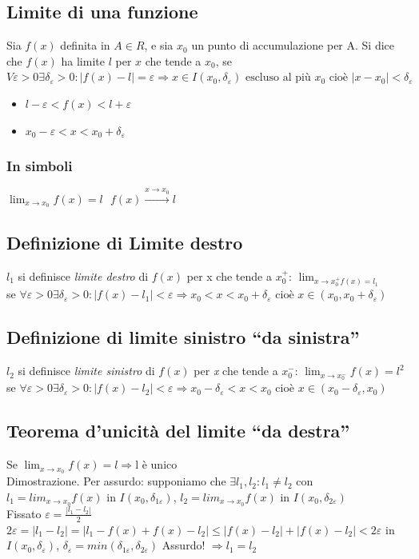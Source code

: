 \subsection{Limite di una funzione}
Sia $f(x)$ definita in $A\in R$, e sia $x_0$ un punto di accumulazione per A.
Si dice che $f(x)$ ha limite $l$ per $x$ che tende a $x_0$, se $V\varepsilon
>0 \exists \delta_\varepsilon > 0: |f(x)-l|=\varepsilon\Rightarrow x\in
I(x_0,\delta_\varepsilon) \text{ escluso al più } x_0 \text{ cioè }
|x-x_0|<\delta_\varepsilon$
\begin{itemize}
	\item $l-\varepsilon < f(x) < l+\varepsilon$
	\item $x_0-\varepsilon < x<x_0+\delta_\varepsilon$
\end{itemize}
\subsubsection{In simboli}
$\lim_{x\to x_0} f(x)=l \text{   } f(x)\xrightarrow{x\to x_0} l$ 
\subsection{Definizione di Limite destro}
$l_1$ si definisce \textit{limite destro} di $f(x)$ per x che tende a $x_0^+$: $\lim_{x\to x_0^+ f(x)=l_1}$\\
se $\forall \varepsilon > 0 \exists \delta_\varepsilon>0 :
|f(x)-l_1|<\varepsilon\Rightarrow x_0<x<x_0+\delta_\varepsilon \text{ cioè }
x\in(x_0,x_0+\delta_\varepsilon)$
\subsection{Definizione di limite sinistro ``da sinistra''}
$l_2$ si definisce \textit{limite sinistro} di $f(x)$ per \textit{x} che tende
a $x^-_0$: $\lim_{x\to x_0^-}f(x)=l^2$ se $\forall \varepsilon>0 \exists
\delta_\varepsilon>0: |f(x)-l_2|<\varepsilon\Rightarrow
x_0-\delta_\varepsilon<x<x_0$ cioè $x\in(x_0-\delta_\varepsilon,x_0)$
\subsection{Teorema d'unicità del limite ``da destra''\label{dadestra}}
Se $\lim_{x\to x_0} f(x)=l\Rightarrow \text{l è unico}$\\
Dimostrazione. Per assurdo: supponiamo che $\exists l_1,l_2: l_1 \neq l_2$
con $l_1=lim_{x\to x_0}f(x)$ in $I(x_0,\delta_{1\varepsilon})$, $l_2=lim_{x\to
x_0}f(x)$ in $I(x_0,\delta_{2\varepsilon})$\\
Fissato $\varepsilon=\frac{|l_1-l_2|}{2}$\\
$2\varepsilon=|l_1-l_2|=|l_1-f(x)+f(x)-l_2|\leq|f(x)-l_2|+|f(x)-l_2|<2\varepsilon$
in $I(x_0,\delta_{\varepsilon})$,
$\delta_{\varepsilon}=min(\delta_{1\varepsilon},\delta_{2\varepsilon})$
Assurdo! $\Rightarrow l_1=l_2$
